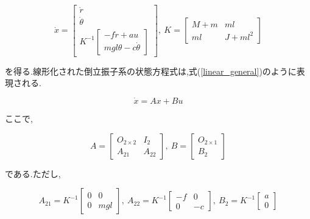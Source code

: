 \documentclass[a4j,11pt,twoside]{jbook}
\begin{document}
\begin{equation}
    \dot x = 
    \left[
        \begin{array}{c}
            \dot{r} \\
            \dot{\theta} \\
            K^{-1}
            \left[
                \begin{array}{c}
                    -f \dot{r} + au \\
                    mgl \theta - c \dot{\theta}
                \end{array}
            \right]
        \end{array}    
    \right],\
    K = 
    \left[
        \begin{array}{cc}
            M + m  &  ml \\
            ml     &  J + ml^2
        \end{array}
    \right]
    \label{linear_k}
\end{equation}

を得る.線形化された倒立振子系の状態方程式は,式(\ref{linear_general})のように表現される.

\begin{equation}
    \dot x = Ax + Bu
    \label{linear_general}
\end{equation}

ここで,

$$
    A = 
    \left[
        \begin{array}{cc}
            O_{2 \times 2}  &  I_{2} \\
            A_{21}          &  A_{22}
        \end{array}
    \right],\
    B = 
     \left[
        \begin{array}{c}
            O_{2 \times 1} \\
            B_{2}
        \end{array}
    \right]
$$

である.ただし,

$$
    A_{21} = K^{-1}
    \left[
        \begin{array}{cc}
            0  &  0 \\
            0  &  mgl
        \end{array}    
    \right],\
    A_{22} = K^{-1}
    \left[
        \begin{array}{cc}
            -f  &  0 \\
            0   &  -c
        \end{array}    
    \right],\
    B_{2} = K^{-1}
    \left[
        \begin{array}{c}
            a \\
            0
        \end{array}    
    \right]
$$
\end{document}
